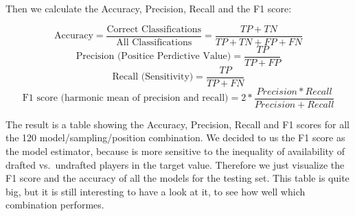 \documentclass[]{article}
\begin{document}
Then we calculate the Accuracy, Precision, Recall and the F1 score:

\[\text{Accuracy} = \frac{\text{Correct Classifications}}{\text{All Classifications}} = \frac{TP + TN}{TP+TN+FP+FN}\]
\[\text{Precision (Positice Perdictive Value)} = \frac{TP}{TP+FP}\]
\[\text{Recall (Sensitivity)} = \frac{TP}{TP+FN}\]
\[\text{F1 score (harmonic mean of precision and recall)}= 2*\frac{Precision * Recall}{Precision + Recall}\]

The result is a table showing the Accuracy, Precision, Recall and F1
scores for all the 120 model/sampling/position combination. We decided
to us the F1 score as the model estimator, because is more sensitive to
the inequality of availability of drafted vs.~undrafted players in the
target value. Therefore we just visualize the F1 score and the accuracy
of all the models for the testing set. This table is quite big, but it
is still interesting to have a look at it, to see how well which
combination performes.

\newpage
\end{document}
